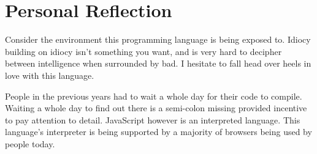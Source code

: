 \documentclass[man]{apa}
\begin{document}
\section{Personal Reflection}

	Consider the environment this programming language is being exposed to. Idiocy building on idiocy isn’t something you want, and is very hard to decipher between intelligence when surrounded by bad. I hesitate to fall head over heels in love with this language.

	People in the previous years had to wait a whole day for their code to compile. Waiting a whole day to find out there is a semi-colon missing provided incentive to pay attention to detail. JavaScript however is an interpreted language. This language’s interpreter is being supported by a majority of browsers being used by people today.
\end{document}
